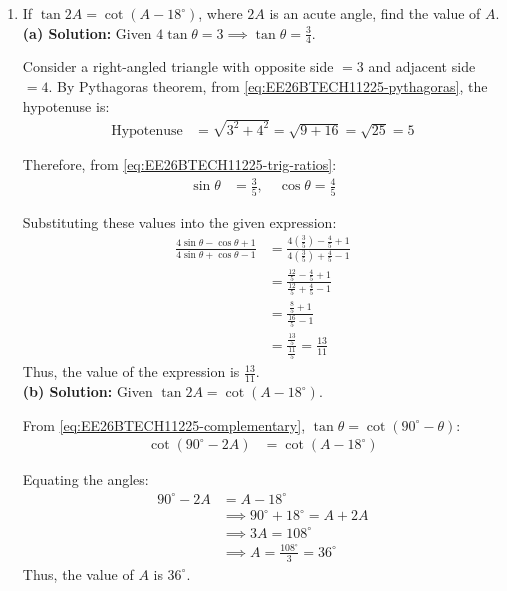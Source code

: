 \begin{enumerate}[label=\thesubsection.\arabic*, ref=\thesubsection.\theenumi]
\begin{enumerate}[label=(\alph*), leftmargin=1.5em, labelsep=0.5em]
        \vspace{0.5em}
        \begin{center}
            \textbf{OR}
        \end{center}
        \vspace{0.5em}

        \item If $\tan 2A = \cot(A - 18^\circ)$, where $2A$ is an acute angle, find the value of $A$.	\\[2pt]
        \noindent\textbf{(a) Solution:} Given $4\tan\theta = 3 \implies \tan\theta = \frac{3}{4}$.

Consider a right-angled triangle with opposite side $= 3$ and adjacent side $= 4$.
By Pythagoras theorem, from \eqref{eq:EE26BTECH11225-pythagoras}, the hypotenuse is:
\begin{align}
    \text{Hypotenuse} &= \sqrt{3^2 + 4^2} = \sqrt{9 + 16} = \sqrt{25} = 5
\end{align}

Therefore, from \eqref{eq:EE26BTECH11225-trig-ratios}:
\begin{align}
    \sin\theta &= \frac{3}{5}, \quad \cos\theta = \frac{4}{5}
\end{align}

Substituting these values into the given expression:
\begin{align}
    \frac{4\sin\theta - \cos\theta + 1}{4\sin\theta + \cos\theta - 1} &= \frac{4\left(\frac{3}{5}\right) - \frac{4}{5} + 1}{4\left(\frac{3}{5}\right) + \frac{4}{5} - 1} \\
    &= \frac{\frac{12}{5} - \frac{4}{5} + 1}{\frac{12}{5} + \frac{4}{5} - 1} \\
    &= \frac{\frac{8}{5} + 1}{\frac{16}{5} - 1} \\
    &= \frac{\frac{13}{5}}{\frac{11}{5}} = \frac{13}{11}
\end{align}
Thus, the value of the expression is $\frac{13}{11}$. \\[8pt]
\noindent\textbf{(b) Solution:} Given $\tan 2A = \cot(A - 18^\circ)$.

From \eqref{eq:EE26BTECH11225-complementary}, $\tan \theta = \cot(90^\circ - \theta)$:
\begin{align}
    \cot(90^\circ - 2A) &= \cot(A - 18^\circ)
\end{align}

Equating the angles:
\begin{align}
    90^\circ - 2A &= A - 18^\circ \\
    &\implies 90^\circ + 18^\circ = A + 2A \\
    &\implies 3A = 108^\circ \\
    &\implies A = \frac{108^\circ}{3} = 36^\circ
\end{align}
Thus, the value of $A$ is $36^\circ$.
        

\end{enumerate}
\end{enumerate}
